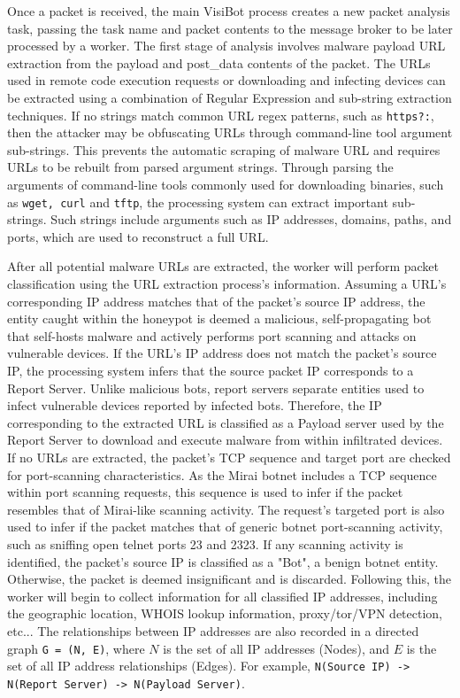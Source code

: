 Once a packet is received, the main VisiBot process creates a new packet analysis task, passing the task name and packet contents to the message broker to be later processed by a worker. The first stage of analysis involves malware payload URL extraction from the payload and post\_data contents of the packet. The URLs used in remote code execution requests or downloading and infecting devices can be extracted using a combination of Regular Expression and sub-string extraction techniques. If no strings match common URL regex patterns, such as \texttt{https?:}, then the attacker may be obfuscating URLs through command-line tool argument sub-strings. This prevents the automatic scraping of malware URL and requires URLs to be rebuilt from parsed argument strings. Through parsing the arguments of command-line tools commonly used for downloading binaries, such as \texttt{wget, curl} and \texttt{tftp}, the processing system can extract important sub-strings. Such strings include arguments such as IP addresses, domains, paths, and ports, which are used to reconstruct a full URL.

After all potential malware URLs are extracted, the worker will perform packet classification using the URL extraction process's information. Assuming a URL's corresponding IP address matches that of the packet's source IP address, the entity caught within the honeypot is deemed a malicious, self-propagating bot that self-hosts malware and actively performs port scanning and attacks on vulnerable devices. If the URL's IP address does not match the packet's source IP, the processing system infers that the source packet IP corresponds to a Report Server. Unlike malicious bots, report servers separate entities used to infect vulnerable devices reported by infected bots. Therefore, the IP corresponding to the extracted URL is classified as a Payload server used by the Report Server to download and execute malware from within infiltrated devices. If no URLs are extracted, the packet's TCP sequence and target port are checked for port-scanning characteristics. As the Mirai botnet includes a TCP sequence within port scanning requests, this sequence is used to infer if the packet resembles that of Mirai-like scanning activity. The request's targeted port is also used to infer if the packet matches that of generic botnet port-scanning activity, such as sniffing open telnet ports 23 and 2323. If any scanning activity is identified, the packet's source IP is classified as a "Bot", a benign botnet entity. Otherwise, the packet is deemed insignificant and is discarded. Following this, the worker will begin to collect information for all classified IP addresses, including the geographic location, WHOIS lookup information, proxy/tor/VPN detection, etc... The relationships between IP addresses are also recorded in a directed graph \texttt{G = (N, E)}, where $N$ is the set of all IP addresses (Nodes), and $E$ is the set of all IP address relationships (Edges). For example, \texttt{N(Source IP) -> N(Report Server) -> N(Payload Server)}.

